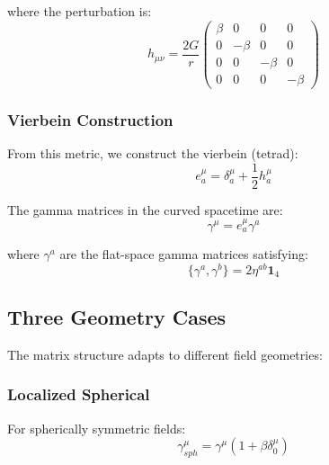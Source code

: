 \documentclass[12pt,a4paper]{article}
\begin{document}
	where the perturbation is:
	\begin{equation}
		h_{\mu\nu} = \frac{2G}{r} \begin{pmatrix}
			\beta & 0 & 0 & 0 \\
			0 & -\beta & 0 & 0 \\
			0 & 0 & -\beta & 0 \\
			0 & 0 & 0 & -\beta
		\end{pmatrix}
		\label{eq:metric_perturbation}
	\end{equation}
	
	\subsubsection{Vierbein Construction}
	\label{subsubsec:vierbein_construction}
	
	From this metric, we construct the vierbein (tetrad):
	\begin{equation}
		e^{\mu}_a = \delta^{\mu}_a + \frac{1}{2}h^{\mu}_a
		\label{eq:vierbein}
	\end{equation}
	
	The gamma matrices in the curved spacetime are:
	\begin{equation}
		\gamma^{\mu} = e^{\mu}_a \gamma^a
		\label{eq:curved_gamma}
	\end{equation}
	
	where $\gamma^a$ are the flat-space gamma matrices satisfying:
	\begin{equation}
		\{\gamma^a, \gamma^b\} = 2\eta^{ab}\mathbf{1}_4
		\label{eq:flat_clifford}
	\end{equation}
	
	\subsection{Three Geometry Cases}
	\label{subsec:three_geometry_matrices}
	
	The matrix structure adapts to different field geometries:
	
	\subsubsection{Localized Spherical}
	\label{subsubsec:spherical_matrices}
	
	For spherically symmetric fields:
	\begin{equation}
		\gamma^{\mu}_{sph} = \gamma^{\mu}(1 + \beta \delta^{\mu}_0)
		\label{eq:spherical_gamma}
	\end{equation}
	
\end{document}
